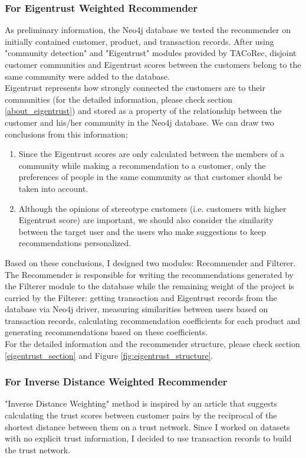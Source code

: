 \subsubsection{For Eigentrust Weighted Recommender}
As preliminary information, the Neo4j database we tested the recommender on initially contained customer, product, and transaction records. After using "community detection" and "Eigentrust" modules provided by TACoRec, disjoint customer communities and Eigentrust scores between the customers belong to the same community were added to the database.\\

Eigentrust represents how strongly connected the customers are to their communities (for the detailed information, please check section \ref{about_eigentrust}) and stored as a property of the relationship between the customer and his/her community in the Neo4j database. We can draw two conclusions from this information;
\begin{enumerate}
	\item Since the Eigentrust scores are only calculated between the members of a community while making a recommendation to a customer, only the preferences of people in the same community as that customer should be taken into account.
	\item Although the opinions of stereotype customers (i.e. customers with higher Eigentrust score) are important, we should also consider the similarity between the target user and the users who make suggestions to keep recommendations personalized.
\end{enumerate}
Based on these conclusions, I designed two modules: Recommender and Filterer. The Recommender is responsible for writing the recommendations generated by the Filterer module to the database while the remaining weight of the project is carried by the Filterer: getting transaction and Eigentrust records from the database via Neo4j driver, measuring similarities between users based on transaction records, calculating recommendation coefficients for each product and generating recommendations based on these coefficients. \\

For the detailed information and the recommender structure, please check section \ref{eigentrust_section} and Figure \ref{fig:eigentrust_structure}.
\subsubsection{For Inverse Distance Weighted Recommender}
"Inverse Distance Weighting" method is inspired by an article\cite{inverse_article} that suggests calculating the trust scores between customer pairs by the reciprocal of the shortest distance between them on a trust network. Since I worked on datasets with no explicit trust information, I decided to use transaction records to build the trust network. \\

